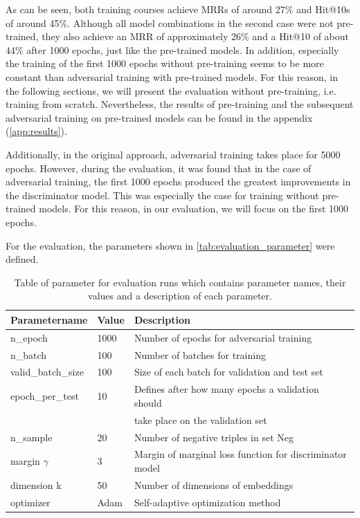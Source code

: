 As can be seen, both training courses achieve MRRs of around 27\% and Hit@10s of around 45\%.
Although all model combinations in the second case were not pre-trained, they also achieve an MRR of approximately 26\% and a Hit@10 of about 44\% after 1000 epochs, just like the pre-trained models.
In addition, especially the training of the first 1000 epochs without pre-training seems to be more constant than adversarial training with pre-trained models.
For this reason, in the following sections, we will present the evaluation without pre-training, i.e. training from scratch.
Nevertheless, the results of pre-training and the subsequent adversarial training on pre-trained models can be found in the appendix (\autoref{app:results}).

Additionally, in the original approach, adversarial training takes place for 5000 epochs.
However, during the evaluation, it was found that in the case of adversarial training, the first 1000 epochs produced the greatest improvements in the discriminator model.
This was especially the case for training without pre-trained models.
For this reason, in our evaluation, we will focus on the first 1000 epochs.

For the evaluation, the parameters shown in \autoref{tab:evaluation_parameter} were defined.
\begin{table}[h]
    \centering
    \begin{tabular}{lll}
        \toprule
        
        \textbf{Parametername} & 
        \textbf{Value} & 
        \textbf{Description} \\
    
        \midrule
         n\_epoch & 1000 & Number of epochs for adversarial training\\
         n\_batch & 100 & Number of batches for training \\
         
         valid\_batch\_size & 100 & Size of each batch for validation and test set\\
         epoch\_per\_test & 10 & Defines after how many epochs a validation should \\
         &  & take place on the validation set \\
         n\_sample & 20 & Number of negative triples in set Neg \\

        margin $\gamma$ & 3 & Margin of marginal loss function for discriminator model\\
        dimension k & 50 & Number of dimensions of embeddings \\ 
        optimizer & Adam & Self-adaptive optimization method \\

        \bottomrule
    \end{tabular}
    \caption{Table of parameter for evaluation runs which contains parameter names, their values and a description of each parameter.}
\label{tab:evaluation_parameter}
\end{table}